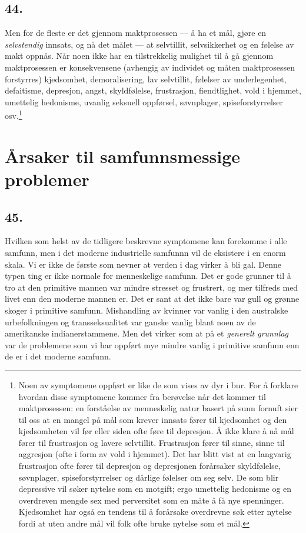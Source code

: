 \documentclass[oneside]{book}
\begin{document}
\section*{44.}
Men for de fleste er det gjennom maktprosessen --- å ha et mål, gjøre en
\emph{selvstendig} innsats, og nå det målet --- at selvtillit, selvsikkerhet og
en
følelse av makt oppnås. Når noen ikke har en tilstrekkelig mulighet til å gå
gjennom maktprosessen er konsekvensene (avhengig av individet og måten
maktprosessen forstyrres) kjedsomhet, demoralisering, lav selvtillit, følelser
av underlegenhet, defaitisme, depresjon, angst, skyldfølelse, frustrasjon,
fiendtlighet, vold i hjemmet, umettelig hedonisme, uvanlig seksuell oppførsel,
søvnplager, spiseforstyrrelser osv.\footnote{Noen av symptomene oppført er
like de som vises av dyr i bur. For å forklare hvordan disse symptomene kommer
fra berøvelse når det kommer til maktprosessen: en forståelse av menneskelig
natur basert på sunn fornuft sier til oss at en mangel på mål som krever
innsats fører til kjedsomhet og den kjedsomheten vil før eller siden ofte føre
til depresjon. Å ikke klare å nå mål fører til frustrasjon og lavere
selvtillit. Frustrasjon fører til sinne, sinne til aggresjon (ofte i form av
vold i hjemmet). Det har blitt vist at en langvarig frustrasjon ofte fører til
depresjon og depresjonen forårsaker skyldfølelse, søvnplager,
spiseforstyrrelser og dårlige følelser om seg selv. De som blir depressive vil
søker nytelse som en motgift; ergo umettelig hedonisme og en overdreven mengde
sex med perversitet som en måte å få nye spenninger. Kjedsomhet har også en
tendens til å forårsake overdrevne søk etter nytelse fordi at uten andre mål
vil folk ofte bruke nytelse som et mål.}

\chapter{Årsaker til samfunnsmessige problemer}
\section*{45.}
Hvilken som helst av de tidligere beskrevne symptomene kan forekomme i alle
samfunn, men i det moderne industrielle samfunnn vil de eksistere i en enorm
skala. Vi er ikke de første som nevner at verden i dag virker å bli gal. Denne
typen ting er ikke normale for menneskelige samfunn. Det er gode grunner til å
tro at den primitive mannen var mindre stresset og frustrert, og mer tilfreds
med livet enn den moderne mannen er. Det er sant at det ikke bare var gull og
grønne skoger i primitive samfunn. Mishandling av kvinner var vanlig i den
australske urbefolkningen og transseksualitet var ganske vanlig blant noen av
de amerikanske indianerstammene. Men det virker som at på et \emph{generelt
grunnlag} var de problemene som vi har oppført mye mindre vanlig i primitive
samfunn enn de er i det moderne samfunn.
\end{document}
